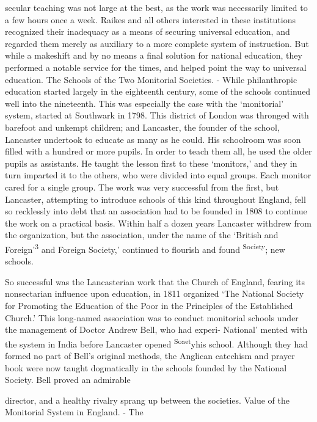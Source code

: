 \documentclass[]{book}
\begin{document}
secular teaching was not large at the best, as the work was necessarily limited to a few hours once a week. Raikes and all others interested in these institutions recognized their inadequacy as a means of securing universal education, and regarded them merely as auxiliary to a more complete system of instruction. But while a makeshift and by no means a final solution for national education, they performed a notable service for the times, and helped point the way to universal education. The Schools of the Two Monitorial Societies. - While philanthropic education started largely in the eighteenth\protect\hypertarget{ch20.xmlux5cux23para.298.1.0.box.143.247.1249.1065.q.60}{}{ century, some of the schools continued well into the nineteenth. This was especially the case with the `monitorial' system, started at Southwark in 1798. This district of London was thronged with barefoot and unkempt children; and Lancaster, the founder of the school, Lancaster undertook to educate as many as he could. His schoolroom was soon filled with a hundred or more pupils. In order to teach them all, he used the older pupils as assistants. He taught the lesson first to these `monitors,' and they in turn imparted it to the others, who were divided into equal groups. Each monitor cared for a single group. The work was very successful from the first, but Lancaster, attempting to introduce schools of this kind throughout England, fell so recklessly into debt that an association had to be founded in 1808 to continue the work on a practical basis. Within half a dozen years Lancaster withdrew from the organization, but the association, under the name of the `British and Foreign'\textsuperscript{3} and Foreign Society,' continued to flourish and found \textsuperscript{Society}; new schools.}

So successful was the Lancasterian work that the Church of England, fearing its nonsectarian influence upon education, in 1811 organized `The National Society for Promoting the Education of the Poor in the Principles of the Established Church.' This long-named association was to conduct monitorial schools under the management of Doctor Andrew Bell, who had experi- National' mented with the system in India before Lancaster opened \textsuperscript{Soaet}yhis school. Although they had formed no part of Bell's original methods, the Anglican catechism and prayer book were now taught dogmatically in the schools founded by the National Society. Bell proved an admirable

director, and a healthy rivalry sprang up between the societies. Value of the Monitorial System in England. - The
\end{document}
